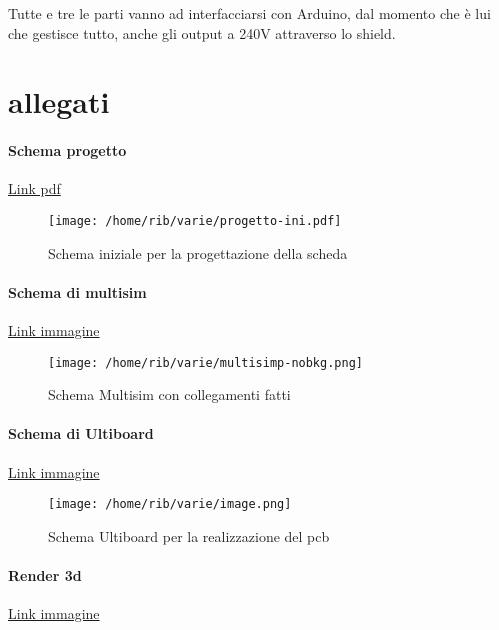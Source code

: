 \documentclass[12pt]{article}
\begin{document}
\noindent
Tutte e tre le parti vanno ad interfacciarsi con Arduino, dal momento che è lui che gestisce tutto, anche gli output a 240V attraverso lo shield.\\

\vfill
\section{allegati} 
\label{sec:allegati}
\paragraph{Schema progetto}
\href{https://drive.google.com/file/d/1qK_MUvGxWjfc9fLc7l3a6s5mL5L6D6fg/view?usp=sharing}{Link pdf}
\begin{figure}[H]
   \centering
        \texttt{[image: /home/rib/varie/progetto-ini.pdf]}
       \label{prog}
       \caption{Schema iniziale per la progettazione della scheda}
\end{figure}

\paragraph{Schema di multisim}
\href{https://drive.google.com/file/d/1VOPnspiu-4T2ZOR6uaUWNH1DUEd0fUcg/view?usp=sharing}{Link immagine}
\begin{figure}[H]
   \centering
        \texttt{[image: /home/rib/varie/multisimp-nobkg.png]}
       \label{multisim}
       \caption{Schema Multisim con collegamenti fatti}
\end{figure}

\paragraph{Schema di Ultiboard}
\href{https://drive.google.com/file/d/1ZlJ_AIXvgzdlvAawX5noBu48i03zm5dP/view?usp=sharing}{Link immagine}
\begin{figure}[H]
    \centering
        \texttt{[image: /home/rib/varie/image.png]}
        \label{ultiabroad}
        \caption{Schema Ultiboard per la realizzazione del pcb}
\end{figure}

\paragraph{Render 3d}
\href{https://drive.google.com/file/d/1EMIzjUSU50ij58dLTjCctJGQM4YIgIii/view?usp=sharing}{Link immagine}
\end{document}
